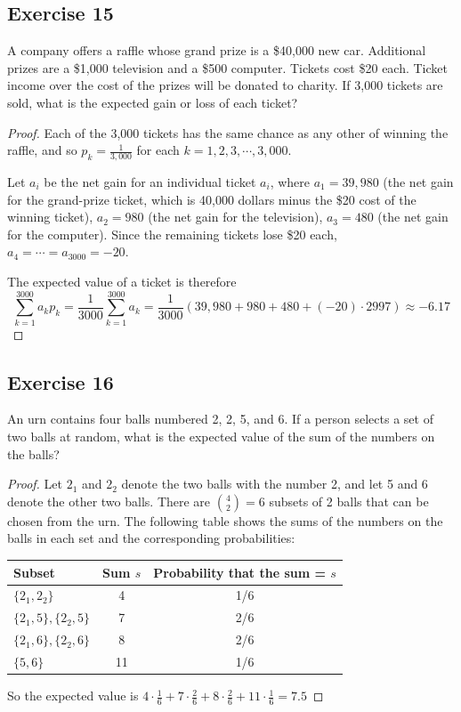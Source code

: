 \documentclass[14pt]{extarticle}
\begin{document}
\subsection{Exercise 15}
A company offers a raffle whose grand prize is a \$40,000 new car. Additional prizes are a \$1,000 television and a \$500 
computer. Tickets cost \$20 each. Ticket income over the cost of the prizes will be donated to charity. If 3,000 tickets are 
sold, what is the expected gain or loss of each ticket?

\begin{proof}
Each of the 3,000 tickets has the same chance as any other of  winning the raffle, and so \(p_k = \frac{1}{3,000}\) for each 
\(k = 1, 2, 3, \cdots, 3,000\).

Let \(a_i\) be the net gain for an individual ticket \(a_i\), where \(a_1 = 39,980\) (the net gain for the grand-prize 
ticket, which is 40,000 dollars minus the \$20 cost of the winning ticket), \(a_2 = 980\) (the net gain for the 
television), \(a_3 = 480\) (the net gain for the computer). Since the remaining tickets lose \$20 each, \(a_4 = \cdots =
a_{3000} = -20\).

The expected value of a ticket is therefore
\[
\sum_{k=1}^{3000}a_kp_k = \frac{1}{3000}\sum_{k=1}^{3000}a_k =  \frac{1}{3000}(39,980+980+480+(-20) \cdot 2997) \approx -6.17
\]
\end{proof}

\subsection{Exercise 16}
An urn contains four balls numbered 2, 2, 5, and 6. If a person selects a set of two balls at random, what is the 
expected value of the sum of the numbers on the balls?

\begin{proof}
Let \(2_1\) and \(2_2\) denote the two balls with the number 2, and let 5 and 6 denote the other two balls. There are 
\(\binom{4}{2} = 6\) subsets of 2 balls that can be chosen from the urn. The following table shows the sums of the 
numbers on the balls in each set and the corresponding probabilities:
\begin{center}
\begin{tabular}{|l|c|c|}
\hline
{\bf Subset} & {\bf Sum \(s\)} & {\bf Probability that the sum = \(s\)} \\
\hline
\(\{2_1, 2_2\}\) & 4 & 1/6 \\
\hline
\(\{2_1,5\}, \{2_2,5\}\) & 7 & 2/6 \\
\hline
\(\{2_1,6\}, \{2_2,6\}\) & 8 & 2/6 \\
\hline
\(\{5,6\}\) & 11 & 1/6 \\
\hline
\end{tabular}
\end{center}
So the expected value is \(4\cdot\frac{1}{6} + 7\cdot \frac{2}{6} + 8 \cdot \frac{2}{6} + 11 \cdot \frac{1}{6} = 7.5\)
\end{proof}
\end{document}
